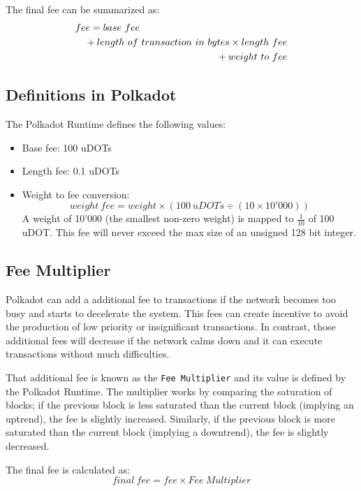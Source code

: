 \documentclass[11pt,a4paper]{article}
\begin{document}
The final fee can be summarized as:
\begin{eqnarray*}
\lefteqn{fee = base\ fee}\\
      &&{} + length\ of\ transaction\ in\ bytes \times length\ fee\\
      &&{} + weight\ to\ fee\\
\end{eqnarray*}

\subsection{Definitions in Polkadot}
The Polkadot Runtime defines the following values:
\begin{itemize}
\item Base fee: 100 uDOTs
\item Length fee: 0.1 uDOTs
\item Weight to fee conversion:
      $$
            weight\ fee = weight \times (100\ uDOTs \div (10 \times 10'000))
      $$
      A weight of 10'000 (the smallest non-zero weight) is mapped to
      $\frac{1}{10}$ of 100 uDOT.
      \newline
      This fee will never exceed the max size of an unsigned 128 bit integer.
\end{itemize}

\subsection{Fee Multiplier}
Polkadot can add a additional fee to transactions if the network becomes too
busy and starts to decelerate the system. This fees can create incentive to
avoid the production of low priority or insignificant transactions. In contrast,
those additional fees will decrease if the network calms down and it can execute
transactions without much difficulties.
\newline

That additional fee is known as the \verb|Fee Multiplier| and its value is
defined by the Polkadot Runtime. The multiplier works by comparing the
saturation of blocks; if the previous block is less saturated than the current
block (implying an uptrend), the fee is slightly increased. Similarly, if the
previous block is more saturated than the current block (implying a downtrend),
the fee is slightly decreased.
\newline

The final fee is calculated as:
$$
      final\ fee = fee \times Fee\ Multiplier
$$
\end{document}
